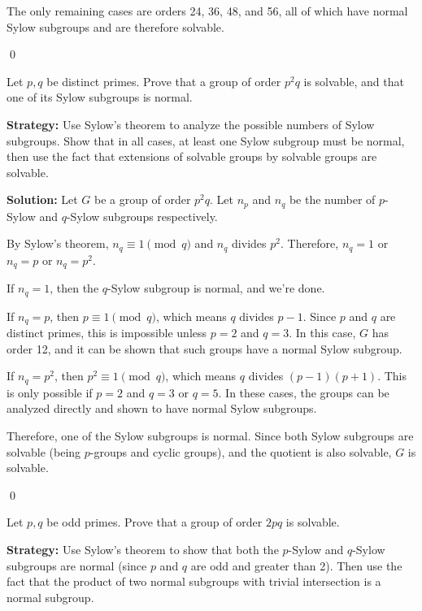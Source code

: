 The only remaining cases are orders 24, 36, 48, and 56, all of which have normal Sylow subgroups and are therefore solvable.


\qed
\begin{problembox}
Let $p, q$ be distinct primes. Prove that a group of order $p^2q$ is solvable, and that one of its Sylow subgroups is normal.
\end{problembox}

\noindent\textbf{Strategy:} Use Sylow's theorem to analyze the possible numbers of Sylow subgroups. Show that in all cases, at least one Sylow subgroup must be normal, then use the fact that extensions of solvable groups by solvable groups are solvable.

\noindent\textbf{Solution:} Let $G$ be a group of order $p^2q$. Let $n_p$ and $n_q$ be the number of $p$-Sylow and $q$-Sylow subgroups respectively.

By Sylow's theorem, $n_q \equiv 1 \pmod{q}$ and $n_q$ divides $p^2$. Therefore, $n_q = 1$ or $n_q = p$ or $n_q = p^2$.

If $n_q = 1$, then the $q$-Sylow subgroup is normal, and we're done.

If $n_q = p$, then $p \equiv 1 \pmod{q}$, which means $q$ divides $p-1$. Since $p$ and $q$ are distinct primes, this is impossible unless $p = 2$ and $q = 3$. In this case, $G$ has order 12, and it can be shown that such groups have a normal Sylow subgroup.

If $n_q = p^2$, then $p^2 \equiv 1 \pmod{q}$, which means $q$ divides $(p-1)(p+1)$. This is only possible if $p = 2$ and $q = 3$ or $q = 5$. In these cases, the groups can be analyzed directly and shown to have normal Sylow subgroups.

Therefore, one of the Sylow subgroups is normal. Since both Sylow subgroups are solvable (being $p$-groups and cyclic groups), and the quotient is also solvable, $G$ is solvable.


\qed
\begin{problembox}
Let $p, q$ be odd primes. Prove that a group of order $2pq$ is solvable.
\end{problembox}

\noindent\textbf{Strategy:} Use Sylow's theorem to show that both the $p$-Sylow and $q$-Sylow subgroups are normal (since $p$ and $q$ are odd and greater than 2). Then use the fact that the product of two normal subgroups with trivial intersection is a normal subgroup.

